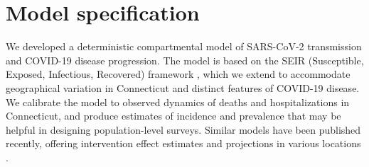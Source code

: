 \documentclass[11pt]{article}
\begin{document}

\section{Model specification}

We developed a deterministic compartmental model of SARS-CoV-2 transmission and COVID-19 disease progression.
The model is based on the SEIR (Susceptible, Exposed, Infectious, Recovered) framework \citep{keeling2011modeling}, which we extend to accommodate geographical variation in Connecticut and distinct features of COVID-19 disease. We calibrate the model to observed dynamics of deaths and hospitalizations in Connecticut, and produce estimates of incidence and prevalence that may be helpful in designing population-level surveys. Similar models have been published recently, offering intervention effect estimates and projections in various locations \citep{cdc2020covid19forecasts, li2020substantial, kissler2020projecting, brett2020covid, perez2020importance, miller2020mobility, childs2020impact, salje2020estimating, salomon2020defining}.
\end{document}
